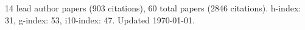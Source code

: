 14 lead author papers (903 citations),
60 total papers (2846 citations).\newline
h-index: 31, g-index: 53, i10-index: 47. Updated \today.